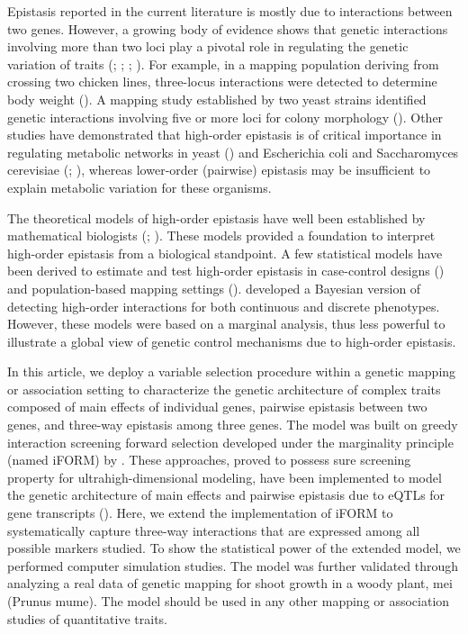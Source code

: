 \documentclass[11pt,]{book}
\theoremstyle{definition}
\theoremstyle{definition}
\theoremstyle{remark}
\begin{document}
Epistasis reported in the current literature is mostly due to
interactions between two genes. However, a growing body of evidence
shows that genetic interactions involving more than two loci play a
pivotal role in regulating the genetic variation of traits
(\cite{wang2010general}; \cite{dowell2010genotype};
\cite{pang2013statistical}; \cite{taylor2014genetic}). For example, in a
mapping population deriving from crossing two chicken lines, three-locus
interactions were detected to determine body weight
(\cite{pettersson2011replication}). A mapping study established by two
yeast strains identified genetic interactions involving five or more
loci for colony morphology (\cite{taylor2014genetic}). Other studies
have demonstrated that high-order epistasis is of critical importance in
regulating metabolic networks in yeast (\cite{weinreich2013should}) and
Escherichia coli and Saccharomyces cerevisiae
(\cite{imielinski2008exploiting}; \cite{he2010prevalent}), whereas
lower-order (pairwise) epistasis may be insufficient to explain
metabolic variation for these organisms.

The theoretical models of high-order epistasis have well been
established by mathematical biologists (\cite{hansen2001epistasis};
\cite{beerenwinkel2007analysis}). These models provided a foundation to
interpret high-order epistasis from a biological standpoint. A few
statistical models have been derived to estimate and test high-order
epistasis in case-control designs (\cite{wang2015bayesian}) and
population-based mapping settings (\cite{pang2013statistical}).
\cite{wang2015bayesian} developed a Bayesian version of detecting
high-order interactions for both continuous and discrete phenotypes.
However, these models were based on a marginal analysis, thus less
powerful to illustrate a global view of genetic control mechanisms due
to high-order epistasis.

In this article, we deploy a variable selection procedure within a
genetic mapping or association setting to characterize the genetic
architecture of complex traits composed of main effects of individual
genes, pairwise epistasis between two genes, and three-way epistasis
among three genes. The model was built on greedy interaction screening
forward selection developed under the marginality principle (named
iFORM) by \cite{hao2014interaction}. These approaches, proved to possess
sure screening property for ultrahigh-dimensional modeling, have been
implemented to model the genetic architecture of main effects and
pairwise epistasis due to eQTLs for gene transcripts
(\cite{gosik2016iform}). Here, we extend the implementation of iFORM to
systematically capture three-way interactions that are expressed among
all possible markers studied. To show the statistical power of the
extended model, we performed computer simulation studies. The model was
further validated through analyzing a real data of genetic mapping for
shoot growth in a woody plant, mei (Prunus mume). The model should be
used in any other mapping or association studies of quantitative traits.
\end{document}
